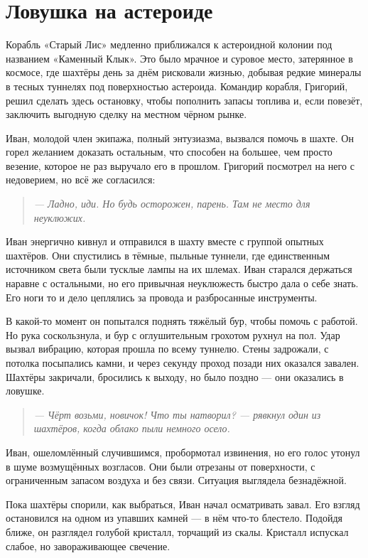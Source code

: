\documentclass[12pt,a4paper]{book}
\newenvironment{dialogue}{\begin{quote}\itshape}{\end{quote}}
\begin{document}
\chapter{Ловушка на астероиде}

Корабль «Старый Лис» медленно приближался к астероидной колонии под названием «Каменный Клык». Это было мрачное и суровое место, затерянное в космосе, где шахтёры день за днём рисковали жизнью, добывая редкие минералы в тесных туннелях под поверхностью астероида. Командир корабля, Григорий, решил сделать здесь остановку, чтобы пополнить запасы топлива и, если повезёт, заключить выгодную сделку на местном чёрном рынке.

Иван, молодой член экипажа, полный энтузиазма, вызвался помочь в шахте. Он горел желанием доказать остальным, что способен на большее, чем просто везение, которое не раз выручало его в прошлом. Григорий посмотрел на него с недоверием, но всё же согласился:

\begin{dialogue}
--- Ладно, иди. Но будь осторожен, парень. Там не место для неуклюжих.
\end{dialogue}

Иван энергично кивнул и отправился в шахту вместе с группой опытных шахтёров. Они спустились в тёмные, пыльные туннели, где единственным источником света были тусклые лампы на их шлемах. Иван старался держаться наравне с остальными, но его привычная неуклюжесть быстро дала о себе знать. Его ноги то и дело цеплялись за провода и разбросанные инструменты.

В какой-то момент он попытался поднять тяжёлый бур, чтобы помочь с работой. Но рука соскользнула, и бур с оглушительным грохотом рухнул на пол. Удар вызвал вибрацию, которая прошла по всему туннелю. Стены задрожали, с потолка посыпались камни, и через секунду проход позади них оказался завален. Шахтёры закричали, бросились к выходу, но было поздно --- они оказались в ловушке.

\begin{dialogue}
--- Чёрт возьми, новичок! Что ты натворил? --- рявкнул один из шахтёров, когда облако пыли немного осело.
\end{dialogue}

Иван, ошеломлённый случившимся, пробормотал извинения, но его голос утонул в шуме возмущённых возгласов. Они были отрезаны от поверхности, с ограниченным запасом воздуха и без связи. Ситуация выглядела безнадёжной.

Пока шахтёры спорили, как выбраться, Иван начал осматривать завал. Его взгляд остановился на одном из упавших камней --- в нём что-то блестело. Подойдя ближе, он разглядел голубой кристалл, торчащий из скалы. Кристалл испускал слабое, но завораживающее свечение.
\end{document}
